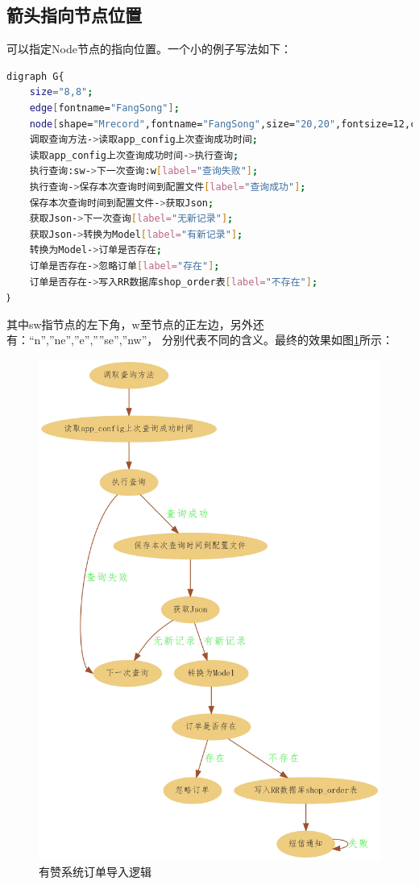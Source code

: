 \documentclass{book}
\begin{document}
\subsection{箭头指向节点位置}

可以指定Node节点的指向位置。一个小的例子写法如下：

\begin{lstlisting}[language=Bash]
digraph G{
	size="8,8";
	edge[fontname="FangSong"];
	node[shape="Mrecord",fontname="FangSong",size="20,20",fontsize=12,color="skyblue",style="filled"]
	调取查询方法->读取app_config上次查询成功时间;	
	读取app_config上次查询成功时间->执行查询;				
	执行查询:sw->下一次查询:w[label="查询失败"];	
	执行查询->保存本次查询时间到配置文件[label="查询成功"];
	保存本次查询时间到配置文件->获取Json;
	获取Json->下一次查询[label="无新记录"];	
	获取Json->转换为Model[label="有新记录"];
	转换为Model->订单是否存在;
	订单是否存在->忽略订单[label="存在"];
	订单是否存在->写入RR数据库shop_order表[label="不存在"];			
｝
\end{lstlisting}

其中sw指节点的左下角，w至节点的正左边，另外还有：“n”,”ne”,”e”,””se”,”nw”，
分别代表不同的含义。最终的效果如图\ref{YZLogic}所示：

\begin{figure}[htbp]
	\centering
	\includegraphics[scale=0.15]{YZLogic.jpg}
	\caption{有赞系统订单导入逻辑}
	\label{YZLogic}
\end{figure}
\end{document}
